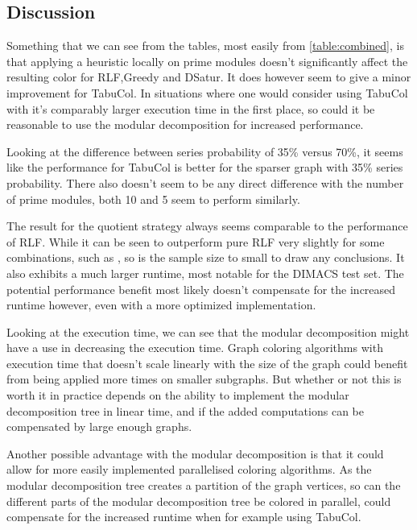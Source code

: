 \documentclass[a4paper]{article}
\begin{document}
\FloatBarrier
\subsection{Discussion}

Something that we can see from the tables, most easily from
\autoref{table:combined}, is that applying a heuristic locally on prime modules
doesn't significantly affect the resulting color for RLF,Greedy and DSatur. It
does however seem to give a minor improvement for TabuCol. In situations where
one would consider using TabuCol with it's comparably larger execution time in
the first place, so could it be reasonable to use the modular decomposition for
increased performance.

Looking at the difference between series probability of 35\% versus 70\%, it
seems like the performance for TabuCol is better for the sparser graph with
35\% series probability. There also doesn't seem to be any direct difference
with the number of prime modules, both 10 and 5 seem to perform similarly.

The result for the quotient strategy always seems comparable to the performance
of RLF. While it can be seen to outperform pure RLF very slightly for some combinations,
such as , 
so is the sample size to small to draw any conclusions. 
It also exhibits a much larger runtime, most notable for the DIMACS test set.
The potential performance benefit most likely doesn't compensate for the
increased runtime however, even with a more optimized implementation.


Looking at the execution time, we can see that the modular decomposition might have a 
use in decreasing the execution time. Graph coloring algorithms with execution time that
doesn't scale linearly with the size of the graph could benefit from being applied
more times on smaller subgraphs. But whether or not this is worth it in practice 
depends on the ability to implement the modular decomposition tree in linear time, 
and if the added computations can be compensated by large enough graphs.

Another possible advantage with the modular decomposition is that it could
allow for more easily implemented parallelised coloring algorithms. As the
modular decomposition tree creates a partition of the graph vertices, so can
the different parts of the modular decomposition tree be colored in parallel,
could compensate for the increased runtime when for example using TabuCol.
\end{document}
